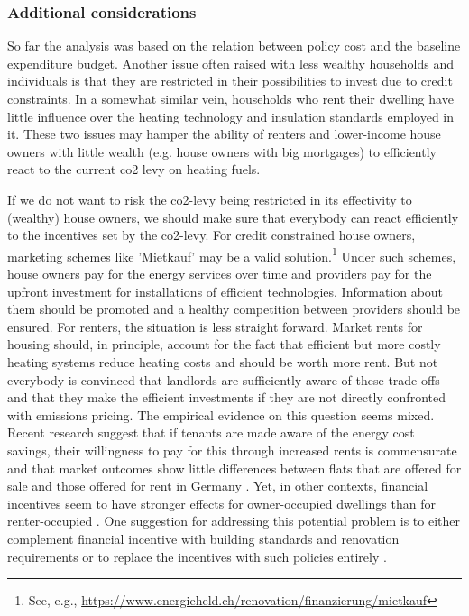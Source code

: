 \documentclass[a4paper,11pt,abstract=true]{scrartcl}
\begin{document}

\subsubsection*{Additional considerations}
\label{sec:consider}

So far the analysis was based on the relation between policy cost and the baseline expenditure budget.
Another issue often raised with less wealthy households and individuals is that they are restricted in their possibilities to invest due to credit constraints.
In a somewhat similar vein, households who rent their dwelling have little influence over the heating technology and insulation standards employed in it.
These two issues may hamper the ability of renters and lower-income house owners with little wealth (e.g. house owners with big mortgages) to efficiently react to the current \ac{co2} levy on heating fuels.

If we do not want to risk the \ac{co2}-levy being restricted in its effectivity to (wealthy) house owners, we should make sure that everybody can react efficiently to the incentives set by the \ac{co2}-levy.
For credit constrained house owners, marketing schemes like 'Mietkauf' may be a valid solution.\footnote{%
  See, e.g., \url{https://www.energieheld.ch/renovation/finanzierung/mietkauf}
}
Under such schemes, house owners pay for the energy services over time and providers pay for the upfront investment for installations of efficient technologies.
Information about them should be promoted and a healthy competition between providers should be ensured.
For renters, the situation is less straight forward.
Market rents for housing should, in principle, account for the fact that efficient but more costly heating systems reduce heating costs and should be worth more rent.
But not everybody is convinced that landlords are sufficiently aware of these trade-offs and that they make the efficient investments if they are not directly confronted with emissions pricing.
The empirical evidence on this question seems mixed.
Recent research suggest that if tenants are made aware of the energy cost savings, their willingness to pay for this through increased rents is commensurate \citep{lang_energy_2021} and that market outcomes show little differences between flats that are offered for sale and those offered for rent in Germany \citep{singhal_split-incentives_2023}.
Yet, in other contexts, financial incentives seem to have stronger effects for owner-occupied dwellings than for renter-occupied \citep{charlier_energy_2015}.
One suggestion for addressing this potential problem is to either complement financial incentive with building standards and renovation requirements or to replace the incentives with such policies entirely \citep{charlier_energy_2015}.
\end{document}

